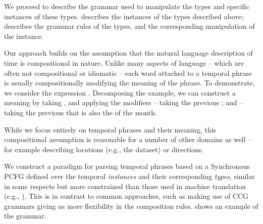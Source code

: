 We proceed to describe the grammar used to manipulate the types and specific
	instances of these types.
 describes the instances of the types described
	above;  describes the grammar rules of the types,
	and the corresponding manipulation of the instance.

Our approach builds on the assumption that the natural language description
	of time is compositional in nature.
Unlike many aspects of language  -- which are often not compositional or
	idiomatic -- each word attached to a temporal phrase is 
	usually compositionally modifying the meaning of the phrase.
To demonstrate, we consider the expression .
Decomposing the example, we can construct a meaning by taking ,
	and applying the modifiers  -- taking the previous ;
	and  -- taking the previous  that is
	also the  of the month.

While we focus entirely on temporal phrases and their meaning, this
	compositional assumption is reasonable for a number of other domains as 
	well -- for example describing locations (e.g., the 
	 dataset) or directions.

We construct a paradigm for parsing temporal phrases based on a Synchronous
	PCFG defined over the temporal \textit{instances} and their
	corresponding \textit{types}, similar in some respects but more
	constrained than those used in machine translation 
	(e.g., ).
This is in contrast to common approaches, such as making use of CCG 
	grammars 
	\cite{key:2000steedman-ccg,key:2004bos-ccg,2011kwiatkowski-semantics}
	giving us more flexibility in the composition rules.
 shows an example of the grammar.

